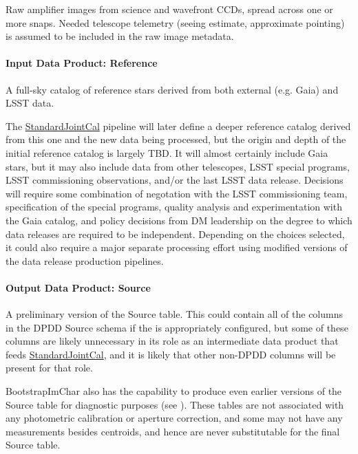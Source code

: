 Raw amplifier images from science and wavefront CCDs, spread across one or more snaps.  Needed telescope telemetry (seeing estimate, approximate pointing) is assumed to be included in the raw image metadata.

\paragraph{Input Data Product: Reference}
\label{sec:drpBootstrapImChar_reference}

A full-sky catalog of reference stars derived from both external (e.g. Gaia) and LSST data.

The \hyperref[sec:drpStandardJointCal]{StandardJointCal} pipeline will later define a deeper reference catalog derived from this one and the new data being processed, but the origin and depth of the initial reference catalog is largely TBD.  It will almost certainly include Gaia stars, but it may also include data from other telescopes, LSST special programs, LSST commissioning observations, and/or the last LSST data release.  Decisions will require some combination of negotation with the LSST commissioning team, specification of the special programs, quality analysis and experimentation with the Gaia catalog, and policy decisions from DM leadership on the degree to which data releases are required to be independent.  Depending on the choices selected, it could also require a major separate processing effort using modified versions of the data release production pipelines.

\paragraph{Output Data Product: Source}
\label{sec:drpBootstrapImChar_sources}

A preliminary version of the Source table.  This could contain all of the columns in the DPDD Source schema if the  is appropriately configured, but some of these columns are likely unnecessary in its role as an intermediate data product that feeds \hyperref[sec:drpStandardJointCal]{StandardJointCal}, and it is likely that other non-DPDD columns will be present for that role.

BootstrapImChar also has the capability to produce even earlier versions of the Source table for diagnostic purposes (see ).  These tables are not associated with any photometric calibration or aperture correction, and some may not have any measurements besides centroids, and hence are never substitutable for the final Source table.

